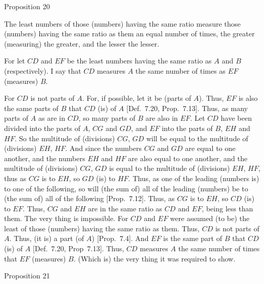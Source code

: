 
\begin{center}
{\large Proposition 20}
\end{center}

The  least numbers of those (numbers) having the
same ratio  measure those (numbers) having the same ratio as them an equal
number of times, the greater (measuring) the greater, and the lesser  the lesser.

For let $CD$ and $EF$ be the least numbers having the same ratio as $A$ and
$B$ (respectively). I say that $CD$ measures $A$ the same number of times
as $EF$ (measures) $B$.

\epsfysize=2in
\centerline{}

For $CD$ is not parts of $A$. For, if possible, let it be (parts of $A$). Thus,
$EF$ is also the same parts of $B$ that $CD$ (is) of $A$  [Def.~7.20, Prop.~7.13]. Thus, as many parts of $A$ as
are in $CD$, so many parts of $B$ are also in $EF$.  Let $CD$ have
been divided into the parts of $A$, $CG$ and $GD$, and $EF$ into the
parts of $B$, $EH$ and $HF$. So the multitude of (divisions) $CG$, $GD$
will be equal to the multitude of (divisions) $EH$, $HF$. And since the
numbers $CG$ and $GD$ are equal to one another, and the numbers
$EH$ and $HF$ are also equal to one another, and the multitude of (divisions)
$CG$, $GD$ is equal to the multitude of (divisions) $EH$, $HF$, thus as $CG$ is to $EH$, so
$GD$ (is) to $HF$. Thus,  as one of the
leading (numbers is) to one of the following, so will (the sum of) all
of the leading (numbers)  be  to (the sum of) all of the following [Prop.~7.12].  Thus, as $CG$ is to $EH$,
so $CD$ (is) to $EF$. Thus, $CG$ and $EH$ are in the same ratio as
$CD$ and $EF$, being less than them. The very thing is impossible. For
$CD$ and $EF$ were assumed (to be) the least of those (numbers) having
the same ratio as them. Thus, $CD$ is not parts of $A$. Thus, (it is) a
part (of $A$) [Prop.~7.4]. And $EF$ is the same part of $B$ that $CD$ (is) of $A$ [Def.~7.20, Prop~7.13]. Thus, $CD$ measures $A$ the same number of times that $EF$ (measures) $B$. (Which is) the very thing it was required to
show.


\begin{center}
{\large Proposition 21}
\end{center}

